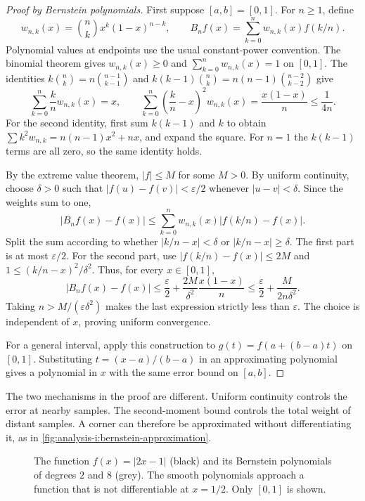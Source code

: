 \begin{proof}[Proof by Bernstein polynomials]
  First suppose $[a,b]=[0,1]$. For $n\ge1$, define
  \[
    w_{n,k}(x)=\binom nk x^k(1-x)^{n-k},\qquad
    B_nf(x)=\sum_{k=0}^n w_{n,k}(x)f(k/n).
  \]
  Polynomial values at endpoints use the usual constant-power convention.
  The binomial theorem gives $w_{n,k}(x)\ge0$ and
  $\sum_{k=0}^n w_{n,k}(x)=1$ on $[0,1]$.
  The identities $k\binom nk=n\binom{n-1}{k-1}$ and
  $k(k-1)\binom nk=n(n-1)\binom{n-2}{k-2}$ give
  \[
    \sum_{k=0}^n\frac{k}{n}w_{n,k}(x)=x,\qquad
    \sum_{k=0}^n\left(\frac{k}{n}-x\right)^2w_{n,k}(x)
       =\frac{x(1-x)}n\le\frac1{4n}.
  \]
  For the second identity, first sum $k(k-1)$ and $k$ to obtain
  $\sum k^2w_{n,k}=n(n-1)x^2+nx$, and expand the square.
  For $n=1$ the $k(k-1)$ terms are all zero, so the same identity holds.

  By the extreme value theorem, $|f|\le M$ for some $M>0$.
  By uniform continuity, choose $\delta>0$ such that
  $|f(u)-f(v)|<\varepsilon/2$ whenever $|u-v|<\delta$.
  Since the weights sum to one,
  \[
    |B_nf(x)-f(x)|
      \le\sum_{k=0}^n w_{n,k}(x)|f(k/n)-f(x)|.
  \]
  Split the sum according to whether $|k/n-x|<\delta$ or
  $|k/n-x|\ge\delta$. The first part is at most $\varepsilon/2$.
  For the second part, use $|f(k/n)-f(x)|\le2M$ and
  $1\le(k/n-x)^2/\delta^2$. Thus, for every $x\in[0,1]$,
  \[
    |B_nf(x)-f(x)|\le\frac{\varepsilon}{2}
      +\frac{2M}{\delta^2}\frac{x(1-x)}n
      \le\frac{\varepsilon}{2}+\frac{M}{2n\delta^2}.
  \]
  Taking $n>M/(\varepsilon\delta^2)$ makes the last expression
  strictly less than $\varepsilon$. The choice is independent of $x$,
  proving uniform convergence.

  For a general interval, apply this construction to
  $g(t)=f(a+(b-a)t)$ on $[0,1]$. Substituting
  $t=(x-a)/(b-a)$ in an approximating polynomial gives a polynomial
  in $x$ with the same error bound on $[a,b]$.
\end{proof}
The two mechanisms in the proof are different. Uniform continuity
controls the error at nearby samples. The second-moment bound controls
the total weight of distant samples. A corner can therefore be
approximated without differentiating it, as in
\autoref{fig:analysis-i:bernstein-approximation}.

\begin{figure}[htbp]
  \centering
  
  \caption[Bernstein approximation of a corner.]{
    The function $f(x)=|2x-1|$ (black) and its Bernstein polynomials
    of degrees $2$ and $8$ (grey). The smooth polynomials approach a
    function that is not differentiable at $x=1/2$. Only $[0,1]$ is shown.}
  \label{fig:analysis-i:bernstein-approximation}
\end{figure}

